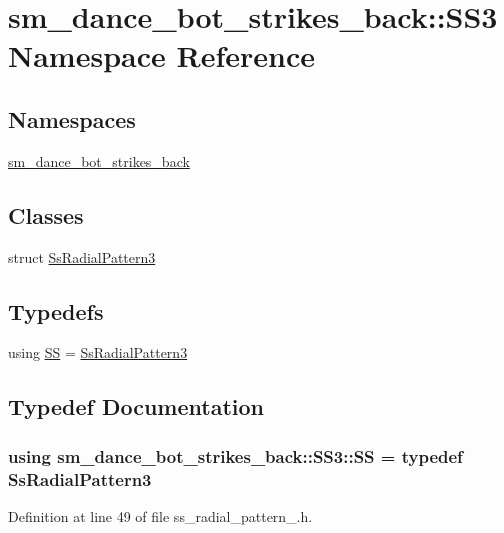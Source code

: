 \hypertarget{namespacesm__dance__bot__strikes__back_1_1SS3}{}\section{sm\+\_\+dance\+\_\+bot\+\_\+strikes\+\_\+back\+:\+:S\+S3 Namespace Reference}
\label{namespacesm__dance__bot__strikes__back_1_1SS3}
\subsection*{Namespaces}
\begin{DoxyCompactItemize}
\item 
 \hyperlink{namespacesm__dance__bot__strikes__back_1_1SS3_1_1sm__dance__bot__strikes__back}{sm\+\_\+dance\+\_\+bot\+\_\+strikes\+\_\+back}
\end{DoxyCompactItemize}
\subsection*{Classes}
\begin{DoxyCompactItemize}
\item 
struct \hyperlink{structsm__dance__bot__strikes__back_1_1SS3_1_1SsRadialPattern3}{Ss\+Radial\+Pattern3}
\end{DoxyCompactItemize}
\subsection*{Typedefs}
\begin{DoxyCompactItemize}
\item 
using \hyperlink{namespacesm__dance__bot__strikes__back_1_1SS3_a4b66297a124923697d0aff0b55de3abc}{SS} = \hyperlink{structsm__dance__bot__strikes__back_1_1SS3_1_1SsRadialPattern3}{Ss\+Radial\+Pattern3}
\end{DoxyCompactItemize}


\subsection{Typedef Documentation}
\subsubsection[{\texorpdfstring{SS}{SS}}]{\setlength{\rightskip}{0pt plus 5cm}using {\bf sm\+\_\+dance\+\_\+bot\+\_\+strikes\+\_\+back\+::\+S\+S3\+::\+SS} = typedef {\bf Ss\+Radial\+Pattern3}}\hypertarget{namespacesm__dance__bot__strikes__back_1_1SS3_a4b66297a124923697d0aff0b55de3abc}{}\label{namespacesm__dance__bot__strikes__back_1_1SS3_a4b66297a124923697d0aff0b55de3abc}


Definition at line 49 of file ss\+\_\+radial\+\_\+pattern\+\_.\+h.

